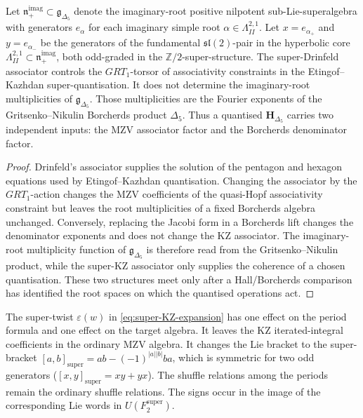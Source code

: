 \begin{theorem}
\label{thm:super-associator-governs-borcherds-leg}
Let $\mathfrak{n}_+^{\mathrm{imag}} \subset \mathfrak{g}_{\Delta_5}$ denote
the imaginary-root positive nilpotent sub-Lie-superalgebra with
generators $e_\alpha$ for each imaginary simple root $\alpha \in
\Lambda^{2,1}_{II}$. Let $x = e_{\alpha_+}$ and $y = e_{\alpha_-}$ be the
generators of the fundamental $\mathfrak{sl}(2)$-pair in the hyperbolic
core $\Lambda^{2,1}_{II} \subset \mathfrak{n}_+^{\mathrm{imag}}$, both
odd-graded in the $\mathbb{Z}/2$-super-structure.  The super-Drinfeld
associator controls the $GRT_1$-torsor of associativity constraints in
the Etingof--Kazhdan super-quantisation.  It does not determine the
imaginary-root multiplicities of $\mathfrak{g}_{\Delta_5}$.  Those
multiplicities are the Fourier exponents of the Gritsenko--Nikulin
Borcherds product $\Delta_5$.  Thus a quantised
$\mathbf H_{\Delta_5}$ carries two independent inputs: the MZV
associator factor and the Borcherds denominator factor.
\end{theorem}

\begin{proof}
Drinfeld's associator supplies the solution of the pentagon and hexagon
equations used by Etingof--Kazhdan quantisation.  Changing the
associator by the $GRT_1$-action changes the MZV coefficients of the
quasi-Hopf associativity constraint but leaves the root multiplicities
of a fixed Borcherds algebra unchanged.  Conversely, replacing the
Jacobi form in a Borcherds lift changes the denominator exponents and
does not change the KZ associator.  The imaginary-root multiplicity
function of $\mathfrak g_{\Delta_5}$ is therefore read from the
Gritsenko--Nikulin product, while the super-KZ associator only supplies
the coherence of a chosen quantisation.  These two structures meet only
after a Hall/Borcherds comparison has identified the root spaces on
which the quantised operations act.
\end{proof}

\begin{remark}
\label{rem:super-twist-role}
The super-twist $\varepsilon(w)$ in \eqref{eq:super-KZ-expansion} has
one effect on the period formula and one effect on the target algebra.
It leaves the KZ iterated-integral coefficients in the ordinary MZV
algebra.  It changes the Lie bracket to the super-bracket
$[a, b]_{\mathrm{super}} = ab - (-1)^{|a||b|} ba$, which is symmetric for
two odd generators ($[x, y]_{\mathrm{super}} = xy + yx$).  The shuffle
relations among the periods remain the ordinary shuffle relations.
The signs occur in the image of the corresponding Lie words in
$U(F_2^{\mathrm{super}})$.
\end{remark}

